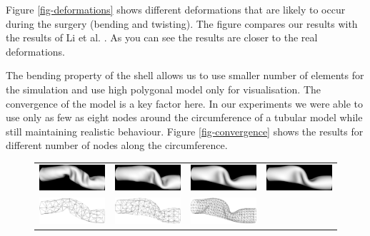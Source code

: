 Figure \ref{fig-deformations} shows different deformations that are likely to
occur during the surgery (bending and twisting). The figure compares our
results with the results of Li et al. \cite{Li2009}. As you can see the
results are closer to the real deformations.

The bending property of the shell allows us to use smaller number of
elements for the simulation and use high polygonal model only for
visualisation. The convergence of the model is a key factor here. In our
experiments we were able to use only as few as eight nodes around the
circumference of a tubular model while still maintaining realistic
behaviour. Figure \ref{fig-convergence} shows the results for different
number of nodes along the circumference.

\begin{figure}[tbh]
  \centering
  \begin{tabular}{cccc}
    \includegraphics[width=0.24\columnwidth]{img/twist-06-cg.png}
    &
    \includegraphics[width=0.24\columnwidth]{img/twist-08-cg.png}
    &
    \includegraphics[width=0.24\columnwidth]{img/twist-16-cg.png}
    &
    \includegraphics[width=0.24\columnwidth]{img/twist-31-cg.png}
    \\
    \includegraphics[width=0.24\columnwidth]{img/twist-06w-cg.png}
    &
    \includegraphics[width=0.24\columnwidth]{img/twist-08w-cg.png}
    &
    \includegraphics[width=0.24\columnwidth]{img/twist-16w-cg.png}

\end{tabular}
\end{figure}
